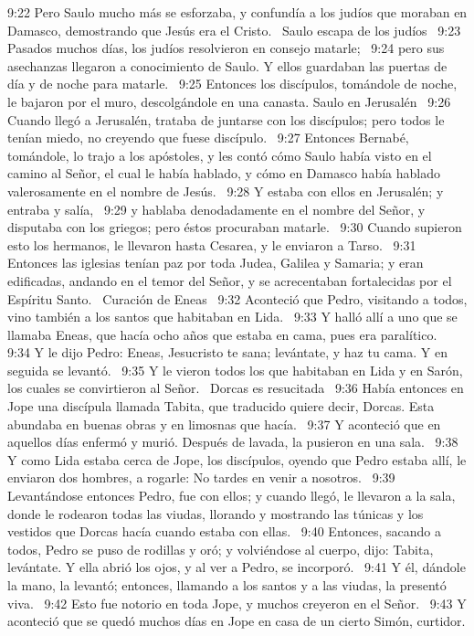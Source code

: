 9:22 Pero Saulo mucho más se esforzaba, y confundía a los judíos que moraban en Damasco, demostrando que Jesús era el Cristo.  
Saulo escapa de los judíos  
9:23 Pasados muchos días, los judíos resolvieron en consejo matarle;  
9:24 pero sus asechanzas llegaron a conocimiento de Saulo. Y ellos guardaban las puertas de día y de noche para matarle.  
9:25 Entonces los discípulos, tomándole de noche, le bajaron por el muro, descolgándole en una canasta. 
Saulo en Jerusalén  
9:26 Cuando llegó a Jerusalén, trataba de juntarse con los discípulos; pero todos le tenían miedo, no creyendo que fuese discípulo.  
9:27 Entonces Bernabé, tomándole, lo trajo a los apóstoles, y les contó cómo Saulo había visto en el camino al Señor, el cual le había hablado, y cómo en Damasco había hablado valerosamente en el nombre de Jesús.  
9:28 Y estaba con ellos en Jerusalén; y entraba y salía,  
9:29 y hablaba denodadamente en el nombre del Señor, y disputaba con los griegos; pero éstos procuraban matarle.  
9:30 Cuando supieron esto los hermanos, le llevaron hasta Cesarea, y le enviaron a Tarso.  
9:31 Entonces las iglesias tenían paz por toda Judea, Galilea y Samaria; y eran edificadas, andando en el temor del Señor, y se acrecentaban fortalecidas por el Espíritu Santo.  
Curación de Eneas  
9:32 Aconteció que Pedro, visitando a todos, vino también a los santos que habitaban en Lida.  
9:33 Y halló allí a uno que se llamaba Eneas, que hacía ocho años que estaba en cama, pues era paralítico.  
9:34 Y le dijo Pedro: Eneas, Jesucristo te sana; levántate, y haz tu cama. Y en seguida se levantó.  
9:35 Y le vieron todos los que habitaban en Lida y en Sarón, los cuales se convirtieron al Señor.  
Dorcas es resucitada  
9:36 Había entonces en Jope una discípula llamada Tabita, que traducido quiere decir, Dorcas. Esta abundaba en buenas obras y en limosnas que hacía.  
9:37 Y aconteció que en aquellos días enfermó y murió. Después de lavada, la pusieron en una sala.  
9:38 Y como Lida estaba cerca de Jope, los discípulos, oyendo que Pedro estaba allí, le enviaron dos hombres, a rogarle: No tardes en venir a nosotros.  
9:39 Levantándose entonces Pedro, fue con ellos; y cuando llegó, le llevaron a la sala, donde le rodearon todas las viudas, llorando y mostrando las túnicas y los vestidos que Dorcas hacía cuando estaba con ellas.  
9:40 Entonces, sacando a todos, Pedro se puso de rodillas y oró; y volviéndose al cuerpo, dijo: Tabita, levántate. Y ella abrió los ojos, y al ver a Pedro, se incorporó.  
9:41 Y él, dándole la mano, la levantó; entonces, llamando a los santos y a las viudas, la presentó viva.  
9:42 Esto fue notorio en toda Jope, y muchos creyeron en el Señor.  
9:43 Y aconteció que se quedó muchos días en Jope en casa de un cierto Simón, curtidor. 
